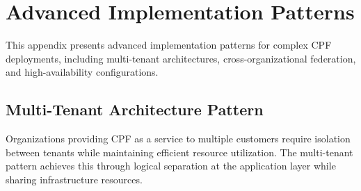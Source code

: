 \documentclass[11pt,a4paper]{article}
\begin{document}
\section{Advanced Implementation Patterns}
\label{app:patterns}

This appendix presents advanced implementation patterns for complex CPF deployments, including multi-tenant architectures, cross-organizational federation, and high-availability configurations.

\subsection{Multi-Tenant Architecture Pattern}

Organizations providing CPF as a service to multiple customers require isolation between tenants while maintaining efficient resource utilization. The multi-tenant pattern achieves this through logical separation at the application layer while sharing infrastructure resources.
\end{document}
